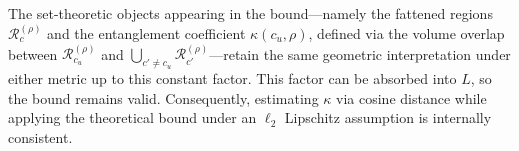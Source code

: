 The set-theoretic objects appearing in the bound—namely the fattened regions $\mathcal{R}_c^{(\rho)}$ and the entanglement coefficient $\kappa(c_u,\rho)$, defined via the volume overlap between $\mathcal{R}_{c_u}^{(\rho)}$ and $\bigcup_{c' \neq c_u}\mathcal{R}_{c'}^{(\rho)}$—retain the same geometric interpretation under either metric up to this constant factor. This factor can be absorbed into $L$, so the bound remains valid. Consequently, estimating $\kappa$ via cosine distance while applying the theoretical bound under an $\ell_2$ Lipschitz assumption is internally consistent.

